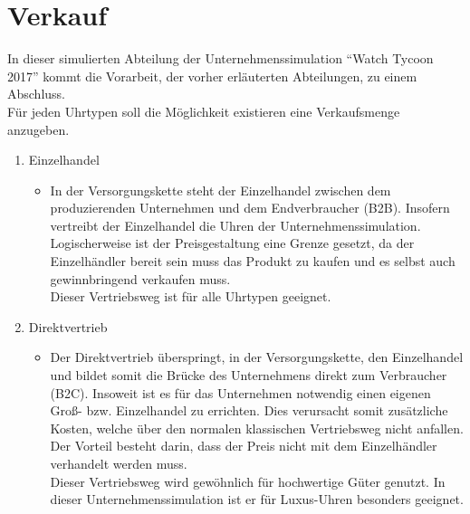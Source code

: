 \section{Verkauf}
In dieser simulierten Abteilung der Unternehmenssimulation \enquote{Watch Tycoon 2017} kommt die Vorarbeit, der vorher erläuterten Abteilungen, zu einem Abschluss. \\
Für jeden Uhrtypen soll die Möglichkeit existieren eine Verkaufsmenge anzugeben. 
\begin{enumerate}
	\item Einzelhandel
\begin{itemize}
	\item In der Versorgungskette steht der Einzelhandel zwischen dem produzierenden Unternehmen und dem Endverbraucher (B2B). Insofern vertreibt der Einzelhandel die Uhren der Unternehmenssimulation. Logischerweise ist der Preisgestaltung eine Grenze gesetzt, da der Einzelhändler bereit sein muss das Produkt zu kaufen und es selbst auch gewinnbringend verkaufen muss. \\
	Dieser Vertriebsweg ist für alle Uhrtypen geeignet. 
\end{itemize}
	\item Direktvertrieb
\begin{itemize}
	\item Der Direktvertrieb überspringt, in der Versorgungskette, den Einzelhandel und bildet somit die Brücke des Unternehmens direkt zum Verbraucher (B2C). Insoweit ist es für das Unternehmen notwendig einen eigenen Groß- bzw. Einzelhandel zu errichten. Dies verursacht somit zusätzliche Kosten, welche über den normalen klassischen Vertriebsweg nicht anfallen. Der Vorteil besteht darin, dass der Preis nicht mit dem Einzelhändler verhandelt werden muss. \\
	Dieser Vertriebsweg wird gewöhnlich für hochwertige Güter genutzt. In dieser Unternehmenssimulation ist er für Luxus-Uhren besonders geeignet.
\end{itemize}
\end{enumerate}

